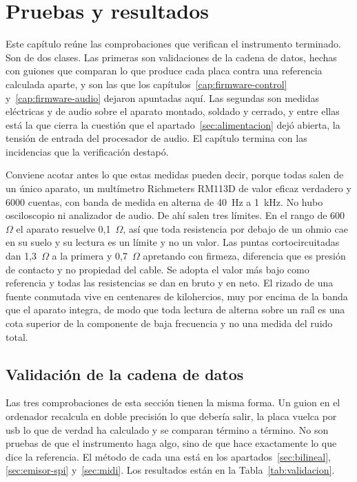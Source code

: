 \chapter{Pruebas y resultados}
\label{cap:pruebas}

Este capítulo reúne las comprobaciones que verifican el instrumento terminado.
Son de dos clases. Las primeras son validaciones de la cadena de datos, hechas
con guiones que comparan lo que produce cada placa contra una referencia
calculada aparte, y son las que los capítulos~\ref{cap:firmware-control}
y~\ref{cap:firmware-audio} dejaron apuntadas aquí. Las segundas son medidas
eléctricas y de audio sobre el aparato montado, soldado y cerrado, y entre
ellas está la que cierra la cuestión que el apartado~\ref{sec:alimentacion}
dejó abierta, la tensión de entrada del procesador de audio. El capítulo
termina con las incidencias que la verificación destapó.

Conviene acotar antes lo que estas medidas pueden decir, porque todas salen de
un único aparato, un multímetro Richmeters RM113D de valor eficaz verdadero y
6000 cuentas, con banda de medida en alterna de 40~Hz a 1~kHz. No hubo
osciloscopio ni analizador de audio. De ahí salen tres límites. En el rango de
600~$\Omega$ el aparato resuelve 0,1~$\Omega$, así que toda resistencia por
debajo de un ohmio cae en su suelo y su lectura es un límite y no un valor. Las
puntas cortocircuitadas dan 1,3~$\Omega$ a la primera y 0,7~$\Omega$ apretando
con firmeza, diferencia que es presión de contacto y no propiedad del cable.
Se adopta el valor más bajo como referencia y todas las resistencias se dan en
bruto y en neto. El rizado de una fuente conmutada vive en centenares de
kilohercios, muy por encima de la banda que el aparato integra, de modo que
toda lectura de alterna sobre un raíl es una cota superior de la componente de
baja frecuencia y no una medida del ruido total.

\section{Validación de la cadena de datos}
\label{sec:validacion-datos}

Las tres comprobaciones de esta sección tienen la misma forma. Un guion en el
ordenador recalcula en doble precisión lo que debería salir, la placa vuelca
por \gls{usb} lo que de verdad ha calculado y se comparan término a término.
No son pruebas de que el instrumento haga algo, sino de que hace exactamente
lo que dice la referencia. El método de cada una está en los
apartados~\ref{sec:bilineal}, \ref{sec:emisor-spi} y~\ref{sec:midi}. Los resultados están
en la Tabla~\ref{tab:validacion}.

